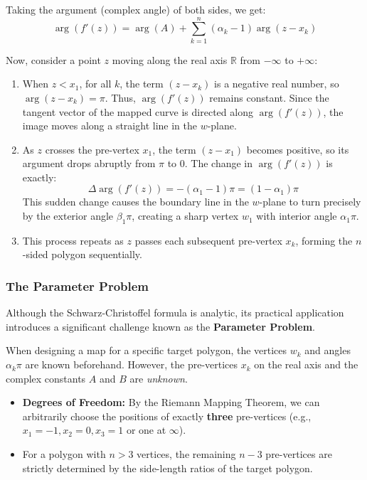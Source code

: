 \documentclass[12pt,a4paper]{article}
\begin{document}
Taking the argument (complex angle) of both sides, we get:
\begin{equation}
    \arg(f'(z)) = \arg(A) + \sum_{k=1}^{n} (\alpha_k - 1) \arg(z - x_k)
\end{equation}

Now, consider a point $z$ moving along the real axis $\mathbb{R}$ from $-\infty$ to $+\infty$:
\begin{enumerate}
    \item When $z < x_1$, for all $k$, the term $(z - x_k)$ is a negative real number, so $\arg(z - x_k) = \pi$. Thus, $\arg(f'(z))$ remains constant. Since the tangent vector of the mapped curve is directed along $\arg(f'(z))$, the image moves along a straight line in the $w$-plane.
    \item As $z$ crosses the pre-vertex $x_1$, the term $(z - x_1)$ becomes positive, so its argument drops abruptly from $\pi$ to $0$. The change in $\arg(f'(z))$ is exactly:
    \begin{equation}
        \Delta \arg(f'(z)) = -(\alpha_1 - 1)\pi = (1 - \alpha_1)\pi
    \end{equation}
    This sudden change causes the boundary line in the $w$-plane to turn precisely by the exterior angle $\beta_1 \pi$, creating a sharp vertex $w_1$ with interior angle $\alpha_1 \pi$.
    \item This process repeats as $z$ passes each subsequent pre-vertex $x_k$, forming the $n$-sided polygon sequentially.
\end{enumerate}

\subsubsection{The Parameter Problem}
Although the Schwarz-Christoffel formula is analytic, its practical application introduces a significant challenge known as the \textbf{Parameter Problem}. 

When designing a map for a specific target polygon, the vertices $w_k$ and angles $\alpha_k \pi$ are known beforehand. However, the pre-vertices $x_k$ on the real axis and the complex constants $A$ and $B$ are \textit{unknown}. 
\begin{itemize}
    \item \textbf{Degrees of Freedom:} By the Riemann Mapping Theorem, we can arbitrarily choose the positions of exactly \textbf{three} pre-vertices (e.g., $x_1 = -1, x_2 = 0, x_3 = 1$ or one at $\infty$). 
    \item For a polygon with $n > 3$ vertices, the remaining $n-3$ pre-vertices are strictly determined by the side-length ratios of the target polygon.
\end{itemize}
\end{document}
